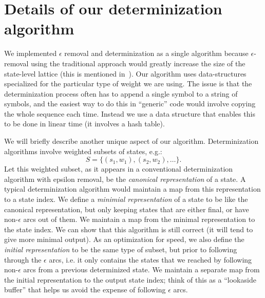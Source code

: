 \documentclass{article}
\begin{document}
\vspace*{-0.075in}
\section{Details of our determinization algorithm}
\vspace*{-0.05in}
\label{sec:details}

We implemented $\epsilon$ removal and determinization as a single algorithm 
because $\epsilon$-removal using the traditional approach would greatly
increase the size of the state-level lattice (this is mentioned 
in~\cite{efficient_general}).  Our algorithm uses data-structures
specialized for the particular type of weight we are using.  The issue
is that the determinization process often has to append a single symbol to
a string of symbols, and the easiest way to
do this in ``generic'' code would involve copying the whole sequence each time.
Instead we use a data structure that enables this to be done in linear
time (it involves a hash table).  

We will briefly describe another unique aspect of our
algorithm.  Determinization algorithms involve weighted subsets of states, e.g.:
\begin{equation}
   S = \{ (s_1, w_1), (s_2, w_2), \ldots \} .
\end{equation}
Let this weighted subset, as it appears in a conventional determinization
algorithm with epsilon removal, be the {\em canonical representation} of a state.
A typical determinization algorithm would maintain a map from this representation
to a state index.  We define a {\em minimial representation} of a state
to be like the canonical representation, but only keeping states that
are either final, or have non-$\epsilon$ arcs out of them.  We maintain
a map from the minimal representation to the state index.  We can
show that this algorithm is still correct (it will tend to give more
minimal output).   As an optimization for speed, we also define
the {\em initial representation} to be the same type of subset, but prior
to following through the $\epsilon$ arcs, i.e. it only contains the states
that we reached by following non-$\epsilon$ arcs from a previous determinized
state.  We maintain a separate map from the initial representation to
the output state index; think of this as a ``lookaside buffer'' that helps us
avoid the expense of following $\epsilon$ arcs. 

\end{document}
